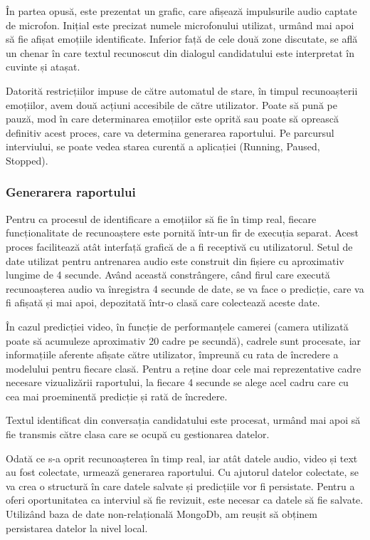 \documentclass[a4paper, 12pt]{report}
\begin{document}
	În partea opusă, este prezentat un grafic, care afișează impulsurile audio captate de microfon. Inițial este precizat numele microfonului utilizat, urmând mai apoi să fie afișat emoțiile identificate. Inferior față de cele două zone discutate, se află un chenar în care textul recunoscut din dialogul candidatului este interpretat în cuvinte și atașat.

	Datorită restricțiilor impuse de către automatul de stare, în timpul recunoașterii emoțiilor, avem două acțiuni accesibile de către utilizator. Poate să pună pe pauză, mod în care determinarea emoțiilor este oprită sau poate să oprească definitiv acest proces, care va determina generarea raportului. Pe parcursul interviului, se poate vedea starea curentă a aplicației (Running, Paused, Stopped).

	\subsubsection{Generarera raportului}
	Pentru ca procesul de identificare a emoțiilor să fie în timp real, fiecare funcționalitate de recunoaștere este pornită într-un fir de execuția separat. Acest proces facilitează atât interfață grafică de a fi receptivă cu utilizatorul. Setul de date utilizat pentru antrenarea audio este construit din fișiere cu aproximativ lungime de 4 secunde. Având această constrângere, când firul care execută recunoașterea audio va înregistra 4 secunde de date, se va face o predicție, care va fi afișată și mai apoi, depozitată într-o clasă care colectează aceste date. 

	În cazul predicției video, în funcție de performanțele camerei (camera utilizată poate să acumuleze aproximativ 20 cadre pe secundă), cadrele sunt procesate, iar informațiile aferente afișate către utilizator, împreună cu rata de încredere a modelului pentru fiecare clasă. Pentru a reține doar cele mai reprezentative cadre necesare vizualizării raportului, la fiecare 4 secunde se alege acel cadru care cu cea mai proeminentă predicție și rată de încredere.

	Textul identificat din conversația candidatului este procesat, urmând mai apoi să fie transmis către clasa care se ocupă cu gestionarea datelor. 	

	Odată ce s-a oprit recunoașterea în timp real, iar atât datele audio, video și text au fost colectate, urmează generarea raportului. Cu ajutorul datelor colectate, se va crea o structură în care datele salvate și predicțiile vor fi persistate. Pentru a oferi oportunitatea ca interviul să fie revizuit, este necesar ca datele să fie salvate. Utilizând baza de date non-relațională MongoDb, am reușit să obținem persistarea datelor la nivel local.
\end{document}
